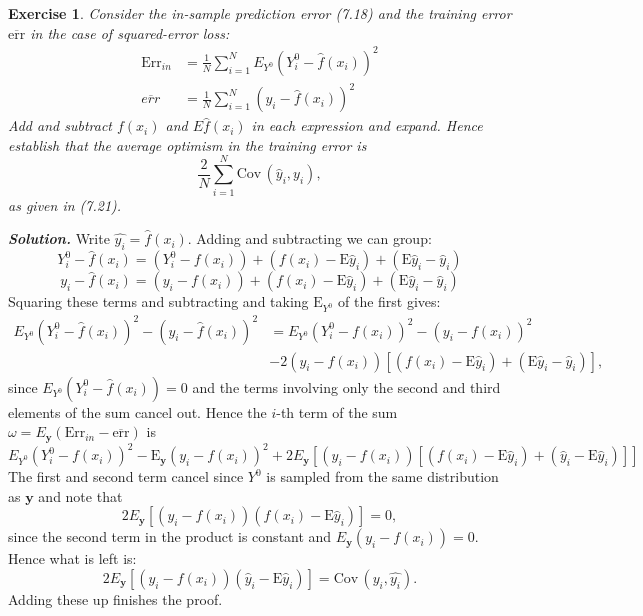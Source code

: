 \documentclass[12pt]{article}
\def\by{\textbf{y}}
\def\E{\text{E}}
\def\Cov{\text{Cov}}
\def\Err{\text{Err}}
\def\err{\text{err}}
\newtheorem{exercise}{Exercise}[section]
\newenvironment{solution}[1][\it{Solution}]{\textbf{#1. } }{\vspace{.5cm}}
\begin{document}
\begin{exercise}
    Consider the in-sample prediction error (7.18) and the training error $\overline{\err}$ in the case of squared-error loss:
    $$\begin{aligned}
        \Err_{in} &= \frac{1}{N} \sum_{i=1}^N E_{Y^0}(Y_i^0 - \hat{f}(x_i))^2 \\
        \overline{err} &= \frac{1}{N} \sum_{i=1}^N (y_i - \hat{f}(x_i))^2
    \end{aligned}$$
    Add and subtract $f(x_i)$ and $E\hat{f}(x_i)$ in each expression and expand. Hence establish that the average optimism in the training error is
    $$\frac{2}{N}\sum_{i=1}^N \Cov\,(\hat{y}_i, y_i),$$
    as given in (7.21).
\end{exercise}
\begin{solution}
    Write $\hat{y_i} = \hat{f}(x_i)$. Adding and subtracting we can group:
    $$Y_i^0 - \hat{f}(x_i) = (Y_i^0-f(x_i)) + (f(x_i) - \E\hat{y}_i) + (\E\hat{y}_i - \hat{y}_i)$$
    $$y_i - \hat{f}(x_i) = (y_i-f(x_i)) + (f(x_i) - \E\hat{y}_i) + (\E\hat{y}_i - \hat{y}_i)$$
    Squaring these terms and subtracting and taking $\E_{Y^0}$ of the first gives:
    $$\begin{aligned}
    E_{Y^0}(Y_i^0 - \hat{f}(x_i))^2 - (y_i - \hat{f}(x_i))^2 &= E_{Y^0}(Y_i^0-f(x_i))^2  - (y_i-f(x_i))^2 \\
    &- 2 (y_i-f(x_i))[(f(x_i) - \E\hat{y}_i) + (\E\hat{y}_i - \hat{y}_i)],
    \end{aligned}$$
    since $E_{Y^0}(Y_i^0 - \hat{f}(x_i)) = 0$ and the terms involving only the second and third elements of the sum cancel out. Hence the $i$-th term of the sum $\omega = E_\by (\Err_{in} - \overline{\err})$ is
    $$ E_{Y^0}(Y_i^0-f(x_i))^2  - \E_\by(y_i-f(x_i))^2 + 2 E_\by [(y_i-f(x_i))[(f(x_i) - \E\hat{y}_i) + (\hat{y}_i - \E \hat{y}_i) ]]$$
    The first and second term cancel since $Y^0$ is sampled from the same distribution as $\by$ and note that 
    $$   2 E_\by [(y_i-f(x_i))(f(x_i) - \E\hat{y}_i)] = 0, $$
    since the second term in the product is constant and $E_\by(y_i-f(x_i)) = 0$. Hence what is left is:
    $$2 E_\by [(y_i-f(x_i))(\hat{y}_i - \E \hat{y}_i)] = \Cov \, (y_i, \hat{y_i}).$$
    Adding these up finishes the proof.

\end{solution}
\end{document}
